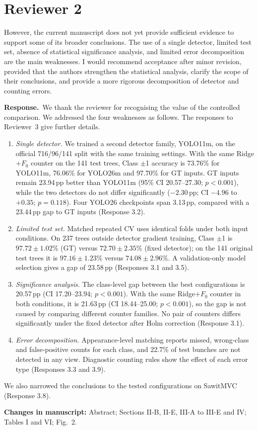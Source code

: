 \documentclass[10pt,a4paper]{article}
\newcommand{\resp}{\textbf{Response.}\ }
\newcommand{\changes}[1]{\par\textbf{Changes in manuscript:} #1}
\newcommand{\pp}{\,pp}
\begin{document}
\section{Reviewer 2}

\begin{cmt}
However, the current manuscript does not yet provide sufficient evidence to support some
of its broader conclusions. The use of a single detector, limited test set, absence of
statistical significance analysis, and limited error decomposition are the main
weaknesses. I would recommend acceptance after minor revision, provided that the authors
strengthen the statistical analysis, clarify the scope of their conclusions, and provide
a more rigorous decomposition of detector and counting errors.
\end{cmt}
\resp We thank the reviewer for recognising the value of the controlled comparison. We
addressed the four weaknesses as follows. The responses to Reviewer~3 give further
details.
\begin{enumerate}[label=(\alph*)]
\item \emph{Single detector.} We trained a second detector family, YOLO11m, on the
  official 716/96/141 split with the same training settings. With the same Ridge$+F_0$
  counter on the 141 test trees, Class $\pm$1 accuracy is 73.76\% for YOLO11m, 76.06\%
  for YOLO26m and 97.70\% for GT inputs. GT inputs remain 23.94\pp{} better than YOLO11m
  (95\% CI 20.57--27.30; $p<0.001$), while the two detectors do not differ significantly
  ($-2.30$\pp; CI $-4.96$ to $+0.35$; $p=0.118$). Four YOLO26 checkpoints span 3.13\pp,
  compared with a 23.44\pp{} gap to GT inputs (Response 3.2).
\item \emph{Limited test set.} Matched repeated CV uses identical folds under both input
  conditions. On 237 trees outside detector gradient training, Class $\pm$1 is
  $97.72\pm1.02$\% (GT) versus $72.70\pm2.35$\% (fixed detector); on the 141 original
  test trees it is $97.16\pm1.23$\% versus $74.08\pm2.96$\%. A validation-only model
  selection gives a gap of 23.58\pp{} (Responses 3.1 and 3.5).
\item \emph{Significance analysis.} The class-level gap between the best configurations
  is 20.57\pp{} (CI 17.20--23.94; $p<0.001$). With the same Ridge$+F_0$ counter in both
  conditions, it is 21.63\pp{} (CI 18.44--25.00; $p<0.001$), so the gap is not caused
  by comparing different counter families. No pair of counters differs significantly
  under the fixed detector after Holm correction (Response 3.1).
\item \emph{Error decomposition.} Appearance-level matching reports missed, wrong-class
  and false-positive counts for each class, and 22.7\% of test bunches are not detected
  in any view. Diagnostic counting rules show the effect of each error type
  (Responses 3.3 and 3.9).
\end{enumerate}
We also narrowed the conclusions to the tested configurations on SawitMVC
(Response 3.8).
\changes{Abstract; Sections II-B, II-E, III-A to III-E and IV; Tables I and VI; Fig.~2.}
\end{document}
